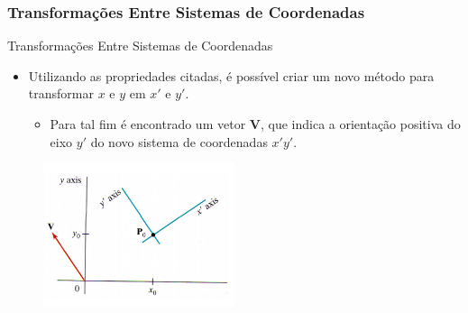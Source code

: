 \documentclass{beamer}
\begin{document}
\begin{frame}
\frametitle{Transformações Entre Sistemas de Coordenadas}

	\begin{block}{Transformações Entre Sistemas de Coordenadas}
		\begin{itemize}
			\item Utilizando as propriedades citadas, é possível criar um novo método para transformar $x$ e $y$ em $x'$ e $y'$.
			\begin{itemize}
				\item Para tal fim é encontrado um vetor \textbf{V}, que indica a orientação positiva do eixo $y'$ do novo sistema de coordenadas $x'y'$.
			\end{itemize}						
		\end{itemize}
	\end{block}
	
	\begin{figure}[!h]
		\begin{center}
			\includegraphics[width=0.5\textwidth]{Figures/novoCoord}
		\end{center}
	\end{figure}
\end{frame}
\end{document}

